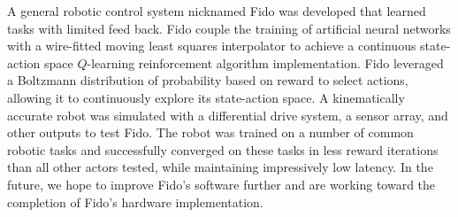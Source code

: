 A general robotic control system nicknamed Fido was developed that learned tasks with limited feed back. Fido couple the training of artificial neural networks with a wire-fitted moving least squares interpolator to achieve a continuous state-action space $Q$-learning reinforcement algorithm implementation. Fido leveraged a Boltzmann distribution of probability based on reward to select actions, allowing it to continuously explore its state-action space. A kinematically accurate robot was simulated with a differential drive system, a sensor array, and other outputs to test Fido. The robot was trained on a number of common robotic tasks and successfully converged on these tasks in less reward iterations than all other actors tested, while maintaining impressively low latency. In the future, we hope to improve Fido's software further and are working toward the completion of Fido's hardware implementation.